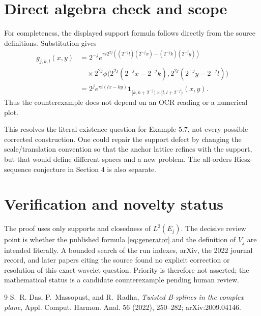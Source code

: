 \documentclass[11pt]{article}
\newcommand{\ind}{\mathbf 1}
\begin{document}
\section{Direct algebra check and scope}

For completeness, the displayed support formula follows directly from the
source definitions.  Substitution gives
\begin{align*}
g_{j,k,l}(x,y)
 &=2^{-j}e^{\pi i2^{2j}
 ((2^{-j}l)(2^{-j}x)-(2^{-j}k)(2^{-j}y))}\\
 &\quad\times
 2^{2j}\phi\bigl(2^{2j}(2^{-j}x-2^{-j}k),
                   2^{2j}(2^{-j}y-2^{-j}l)\bigr)\\
 &=2^j e^{\pi i(lx-ky)}
 \ind_{[k,k+2^{-j})\times[l,l+2^{-j})}(x,y).
\end{align*}
Thus the counterexample does not depend on an OCR reading or a numerical
plot.

This resolves the literal existence question for Example 5.7, not every
possible corrected construction.  One could repair the support defect by
changing the scale/translation convention so that the anchor lattice refines
with the support, but that would define different spaces and a new problem.
The all-orders Riesz-sequence conjecture in Section 4 is also separate.

\section{Verification and novelty status}

The proof uses only supports and closedness of $L^2(E_j)$.  The decisive
review point is whether the published formula \eqref{eq:generator} and the
definition of $V_j$ are intended literally.  A bounded search of the run
indexes, arXiv, the 2022 journal record, and later papers citing the source
found no explicit correction or resolution of this exact wavelet question.
Priority is therefore not asserted; the mathematical status is a candidate
counterexample pending human review.

\begin{thebibliography}{9}
S.~R. Das, P.~Massopust, and R.~Radha,
\emph{Twisted B-splines in the complex plane},
Appl. Comput. Harmon. Anal. 56 (2022), 250--282;
arXiv:2009.04146.
\end{thebibliography}
\end{document}
